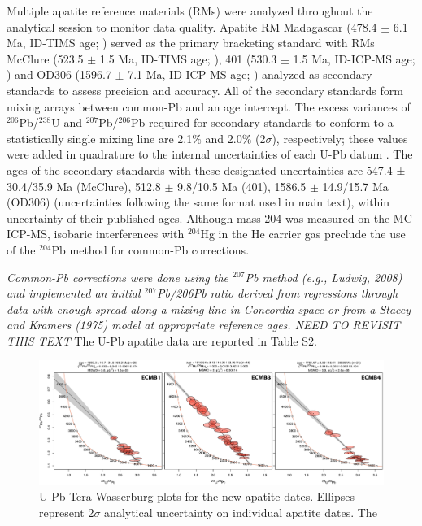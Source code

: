 \documentclass[11pt,letterpaper]{article}
\begin{document}
Multiple apatite reference materials (RMs) were analyzed throughout the analytical session to monitor data quality. Apatite RM Madagascar (478.4 $\pm$ 6.1 Ma, ID-TIMS age; \citealp{Thomson2012a}) served as the primary bracketing standard with RMs McClure (523.5 $\pm$ 1.5 Ma, ID-TIMS age; \citealp{Schoene2006a}), 401 (530.3 $\pm$ 1.5 Ma, ID-ICP-MS age; \citealp{Thompson2016a}) and OD306 (1596.7 $\pm$ 7.1 Ma, ID-ICP-MS age; \citealp{Thompson2016a}) analyzed as secondary standards to assess precision and accuracy. All of the secondary standards form mixing arrays between common-Pb and an age intercept. The excess variances of $^{206}$Pb/$^{238}$U and $^{207}$Pb/$^{206}$Pb required for secondary standards to conform to a statistically single mixing line are 2.1$\%$ and 2.0$\%$ (2$\sigma$), respectively; these values were added in quadrature to the internal uncertainties of each U-Pb datum \citep{Horstwood2016a}. The ages of the secondary standards with these designated uncertainties are 547.4 ± 30.4/35.9 Ma (McClure), 512.8 $\pm$ 9.8/10.5 Ma (401), 1586.5 $\pm$ 14.9/15.7 Ma (OD306) (uncertainties following the same format used in main text), within uncertainty of their published ages. Although mass-204 was measured on the MC-ICP-MS, isobaric interferences with $^{204}$Hg in the He carrier gas preclude the use of the $^{204}$Pb method for common-Pb corrections.

\textit{Common-Pb corrections were done using the $^{207}$Pb method (e.g., Ludwig, 2008) and implemented an initial $^{207}$Pb/206Pb ratio derived from regressions through data with enough spread along a mixing line in Concordia space or from a Stacey and Kramers (1975) model at appropriate reference ages. NEED TO REVISIT THIS TEXT}  The U-Pb apatite data are reported in Table S2.


\begin{figure}[!ht]
\noindent\includegraphics[width=\textwidth]{./figures/SI_apatite_TW.pdf}
\centering
\caption{\small{U-Pb Tera-Wasserburg plots for the new apatite dates. Ellipses represent 2$\sigma$ analytical uncertainty on individual apatite dates. The }}
\label{fig:apatite_TW}
\end{figure}
\end{document}

